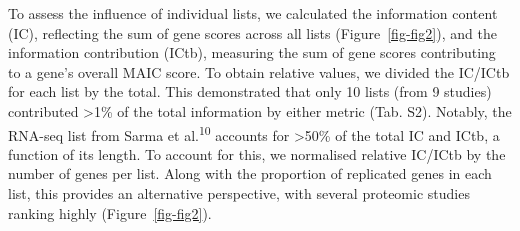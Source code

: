\documentclass[
  11,
  a4paper,
]{article}
\begin{document}
To assess the influence of individual lists, we calculated the
information content (IC), reflecting the sum of gene scores across all
lists (Figure~\ref{fig-fig2}), and the information contribution (ICtb),
measuring the sum of gene scores contributing to a gene's overall MAIC
score. To obtain relative values, we divided the IC/ICtb for each list
by the total. This demonstrated that only 10 lists (from 9 studies)
contributed \textgreater1\% of the total information by either metric
(Tab. S2). Notably, the RNA-seq list from Sarma et
al.\textsuperscript{10} accounts for \textgreater50\% of the total IC
and ICtb, a function of its length. To account for this, we normalised
relative IC/ICtb by the number of genes per list. Along with the
proportion of replicated genes in each list, this provides an
alternative perspective, with several proteomic studies ranking highly
(Figure~\ref{fig-fig2}).
\end{document}

